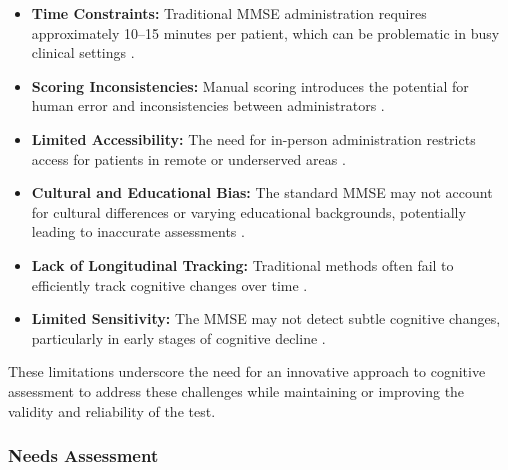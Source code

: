 \begin{itemize}
    \item \textbf{Time Constraints:} Traditional MMSE administration requires approximately 10–15 minutes per patient, which can be problematic in busy clinical settings \cite{Folstein1975}.
    
    \item \textbf{Scoring Inconsistencies:} Manual scoring introduces the potential for human error and inconsistencies between administrators \cite{Tombaugh1992}.
    
    \item \textbf{Limited Accessibility:} The need for in-person administration restricts access for patients in remote or underserved areas \cite{Bauer2012}.
    
    \item \textbf{Cultural and Educational Bias:} The standard MMSE may not account for cultural differences or varying educational backgrounds, potentially leading to inaccurate assessments \cite{Cullen2007}.
    
    \item \textbf{Lack of Longitudinal Tracking:} Traditional methods often fail to efficiently track cognitive changes over time \cite{Goldberg2015}.
    
    \item \textbf{Limited Sensitivity:} The MMSE may not detect subtle cognitive changes, particularly in early stages of cognitive decline \cite{Mitchell2009}.
\end{itemize}

These limitations underscore the need for an innovative approach to cognitive assessment to address these challenges while maintaining or improving the validity and reliability of the test.

\subsubsection{Needs Assessment}

